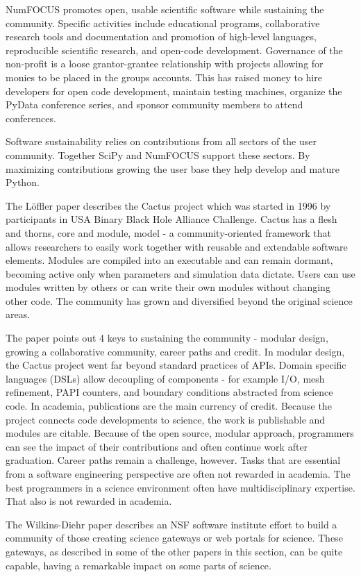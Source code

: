 \documentclass[11pt, oneside]{amsart}
\begin{document}
NumFOCUS promotes open, usable scientific software while sustaining the
community. Specific activities include educational programs, collaborative
research tools and documentation and promotion of high-level languages,
reproducible scientific research, and open-code development. Governance of the
non-profit is a loose grantor-grantee relationship with projects allowing for
monies to be placed in the groups accounts. This has raised money to hire
developers for open code development, maintain testing machines, organize the
PyData conference series, and sponsor community members to attend conferences.

Software sustainability relies on contributions from all sectors of the user
community. Together SciPy and NumFOCUS support these sectors. By maximizing
contributions growing the user base they help develop and mature Python.

The L\"{o}ffler paper describes the Cactus project which was started in 1996 by
participants in USA Binary Black Hole Alliance Challenge. Cactus has a flesh
and thorns, core and module, model - a community-oriented framework that allows
researchers to easily work together with reusable and extendable software
elements. Modules are compiled into an executable and can remain dormant,
becoming active only when parameters and simulation data dictate. Users can
use modules written by others or can write their own modules without changing
other code. The community has grown and diversified beyond the original science
areas.

The paper points out 4 keys to sustaining the community - modular design,
growing a collaborative community, career paths and credit. In modular design,
the Cactus project went far beyond standard practices of APIs. Domain specific
languages (DSLs) allow decoupling of components - for example I/O, mesh
refinement, PAPI counters, and boundary conditions abstracted from science
code. In academia, publications are the main currency of credit. Because the
project connects code developments to science, the work is publishable and
modules are citable. Because of the open source, modular approach, programmers
can see the impact of their contributions and often continue work after
graduation. Career paths remain a challenge, however. Tasks that are essential
from a software engineering perspective are often not rewarded in academia. The
best programmers in a science environment often have multidisciplinary
expertise. That also is not rewarded in academia.

The Wilkins-Diehr paper describes an NSF software institute effort to build a
community of those creating science gateways or web portals for science. These
gateways, as described in some of the other papers in this section, can be
quite capable, having a remarkable impact on some parts of science.
\end{document}
